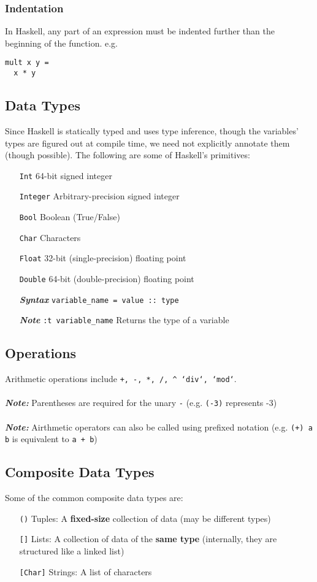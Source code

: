 \documentclass{article}
\begin{document}
\subsubsection{Indentation} In Haskell, any part of an expression must be
indented further than the beginning of the function. e.g.
\begin{verbatim}
mult x y =
  x * y \end{verbatim}

\subsection{Data Types}
Since Haskell is statically typed and uses type inference, though the
variables' types are figured out at compile time, we need not
explicitly annotate them (though possible). The following are some of
Haskell's primitives:
\begin{enumerate}[align=left]
\item [\texttt{Int}] 64-bit signed integer
\item [\texttt{Integer}] Arbitrary-precision signed integer
\item [\texttt{Bool}] Boolean (True/False)
\item [\texttt{Char}] Characters  
\item [\texttt{Float}] 32-bit (single-precision) floating point
\item [\texttt{Double}] 64-bit (double-precision) floating point
\item [\textit{\textbf{Syntax}}] \texttt{variable\_name = value :: type}
\item [\textit{\textbf{Note}}] \texttt{:t variable\_name} Returns the type of a variable
\end{enumerate}

\subsection{Operations} Arithmetic operations include \texttt{+, -, *,
  /, \string^ `div`, `mod`}. \\ \\
\textit{\textbf{Note:}} Parentheses are required for the unary \texttt{-}
(e.g. \texttt{(-3)} represents -3) \\ \\
\textit{\textbf{Note:}} Airthmetic operators can also be called using
prefixed notation (e.g. \texttt{(+) a b} is equivalent to \texttt{a + b})

\subsection{Composite Data Types} Some of the common composite data
types are:
\begin{enumerate}[align=left]
\item [\texttt{()}] Tuples: A \textbf{fixed-size} collection of data (may be different types)
\item [\texttt{[]}] Lists: A collection of data of the \textbf{same type} (internally, they
  are structured like a linked list)
\item [\texttt{[Char]}] Strings: A list of characters
\end{enumerate}
\end{document}
